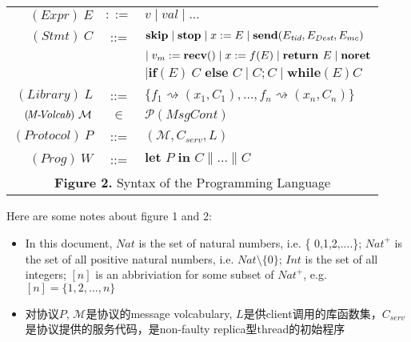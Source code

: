\documentclass[UTF8, 8pt, a4paper ]{ctexart}
\begin{document}
\begin{small}
				
		\begin{longtable}{rcl}
			\hline
				$ (\!\textit{Expr})\ E $ & $ ::= $ & $ v \mid val \mid ... $ \\
				
				
				
				$ (\!\textit{Stmt})\ C $ & ::= & $ \textbf{skip} \mid \textbf{stop} \mid x \!\!\ :=\ \!\! E \mid \textbf{send}(E_{\textit{tid}}, E_{\textit{Dest}}, E_{mc})  $ \\
				
				&& $ \mid v_m \assign \textbf{recv}()  \mid x \assign f(E) \mid  \textbf{return } E \mid \textbf{noret}  $ \\
				&& $\mid \textbf{if}(E)\ C \textbf{ else } C  \mid C;C \mid \textbf{while}(E) C  $ \\
				$ (\!\textit{Library})\ L $ & ::= & $ \{ f_1 \rightsquigarrow (x_1, C_1), ..., f_n \rightsquigarrow (x_n, C_n) \} $\\

				$ (\!\textit{M-\!Volcab})\ \mathcal{M} $ & $ \in $ & $ \mathscr{P}(\!\textit{MsgCont}) $ \\

				$ (\!\textit{Protocol})\ P $ & ::= & $ (\mathcal{M}, C_{\textit{serv}}, L) $ \\
				
				$ (\!\textit{Prog})\  {W} $ & ::= & $ \textbf{let } P \textbf{ in } C \parallel ... \parallel C  $ \\
				
				\hline
				
				\multicolumn{3}{c}{\textbf{Figure 2.} Syntax of the Programming Language} \\
			
		\end{longtable}
	
	
	Here are some notes about figure 1 and 2:
	\begin{itemize}
		\item In this document, $ \textit{Nat} $ is the set of natural numbers, i.e. \{ 0,1,2,....\}; $ \textit{Nat}^{+} $ is the set of all positive natural numbers, i.e. $ \textit{Nat} \setminus \{0\} $; $ \textit{Int} $ is the set of all integers; $ [n] $ is an abbriviation for some subset of $ \textit{Nat}^{+} $, e.g. $ [n] = \{1,2,..., n\} $


		\item 对协议$ P $, $ \mathcal{M} $是协议的message volcabulary, $ L $是供client调用的库函数集，$ C_{\textit{serv}} $是协议提供的服务代码，是non-faulty replica型thread的初始程序
		

\end{itemize}
\end{small}
\end{document}
